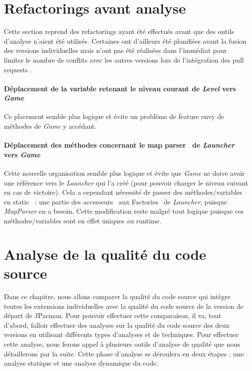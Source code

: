 \documentclass[12pt, openany]{report}
\begin{document}
\section{Refactorings avant analyse}
Cette section reprend des refactorings ayant été effectués avant que des outils d'analyse n'aient été utilisés. Certaines ont d'ailleurs été
planifiées avant la fusion des versions individuelles mais n'ont pas été réalisées dans l'immédiat pour limiter le nombre de conflits avec les autres versions lors de l'intégration des \og pull requests \fg .

\paragraph{Déplacement de la variable retenant le niveau courant de \textit{Level} vers \textit{Game}}
Ce placement semble plus logique et évite un problème de \og feature envy \fg de méthodes de \mbox{\textit{Game}} y accédant.
\paragraph{Déplacement des méthodes concernant le \og map parser \fg \, de \textit{Launcher} vers \textit{Game}}
Cette nouvelle organisation semble plus logique et évite que \mbox{\textit{Game}} ne doive avoir une référence vers le \mbox{\textit{Launcher}} qui l’a créé (pour pouvoir charger le niveau suivant en cas de victoire).
Cela a cependant nécessité de passer des méthodes/variables en \og static \fg \, : une partie des \og accesseurs \fg \, aux \og Factories \fg \, de \mbox{\textit{Launcher}}, puisque \mbox{\textit{MapParser}} en a besoin. Cette modification reste malgré tout logique puisque ces méthodes/variables sont en effet uniques au runtime.

\section{Analyse de la qualité du code source}

Dans ce chapitre, nous allons comparer la qualité du code source qui intègre toutes les extensions individuelles avec la qualité du code source de la version de départ de JPacman. Pour pouvoir effectuer cette comparaison, il va, tout d'abord, falloir effectuer des analyses sur la qualité du code source des deux versions en utilisant différents types d'analyses et de techniques. Pour effectuer cette analyse, nous ferons appel à plusieurs outils d'analyse de qualité que nous détaillerons par la suite. Cette phase d'analyse se déroulera en deux étapes : une analyse statique et une analyse dynamique du code.
\end{document}

